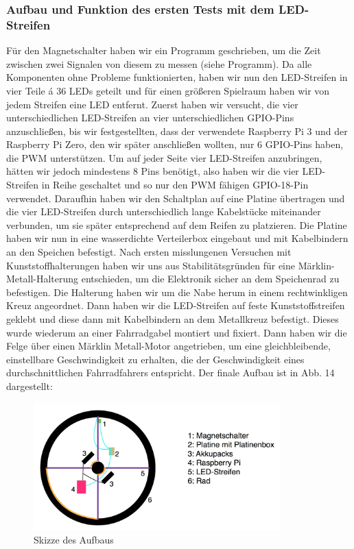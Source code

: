 \documentclass [a4paper, 11pt] {article}
\begin{document}
\subsubsection{Aufbau und Funktion des ersten Tests mit dem LED-Streifen}
Für den Magnetschalter haben wir ein Programm geschrieben, um die Zeit zwischen zwei Signalen von diesem zu messen (siehe Programm).
Da alle Komponenten ohne Probleme funktionierten, haben wir nun den LED-Streifen in vier Teile á 36 LEDs geteilt und für einen größeren Spielraum haben wir von jedem Streifen eine LED entfernt. Zuerst haben wir versucht, die vier unterschiedlichen LED-Streifen an vier unterschiedlichen GPIO-Pins anzuschließen, bis wir festgestellten, dass der verwendete Raspberry Pi 3 und der Raspberry Pi Zero, den wir später anschließen wollten, nur 6 GPIO-Pins haben, die PWM unterstützen. Um auf jeder Seite vier LED-Streifen anzubringen, hätten wir jedoch mindestens 8 Pins benötigt, also haben wir die vier LED-Streifen in Reihe geschaltet und so nur den PWM fähigen GPIO-18-Pin verwendet.
Daraufhin haben wir den Schaltplan auf eine Platine übertragen und die vier LED-Streifen durch unterschiedlich lange Kabelstücke miteinander verbunden, um sie später entsprechend auf dem Reifen zu platzieren. Die Platine haben wir nun in eine wasserdichte Verteilerbox eingebaut und mit Kabelbindern an den Speichen befestigt.
Nach ersten misslungenen Versuchen mit Kunststoffhalterungen haben wir uns aus Stabilitätsgründen für eine Märklin-Metall-Halterung entschieden, um die Elektronik sicher an dem Speichenrad zu befestigen. Die Halterung haben wir um die Nabe herum in einem rechtwinkligen Kreuz angeordnet. Dann haben wir die LED-Streifen auf feste Kunststoffstreifen geklebt und diese dann mit Kabelbindern an dem Metallkreuz befestigt. Dieses wurde wiederum an einer Fahrradgabel montiert und fixiert. Dann haben wir die Felge über einen Märklin Metall-Motor angetrieben, um eine gleichbleibende, einstellbare Geschwindigkeit zu erhalten, die der Geschwindigkeit eines durchschnittlichen Fahrradfahrers entspricht. Der finale Aufbau ist in Abb. 14 dargestellt:
\begin{figure}[h]
	\centering
	\includegraphics[width=9.5cm]{Rad.png}
	\caption{Skizze des Aufbaus}
\end{figure}
\end{document}
